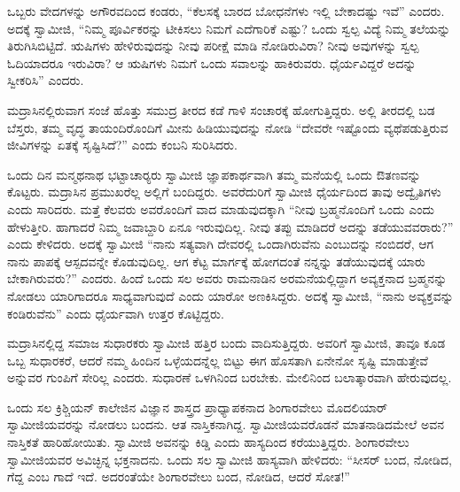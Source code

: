  ಒಬ್ಬರು ವೇದಗಳನ್ನು ಅಗೌರವದಿಂದ ಕಂಡರು, “ಕೆಲಸಕ್ಕೆ ಬಾರದ ಬೋಧನೆಗಳು ಇಲ್ಲಿ ಬೇಕಾದಷ್ಟು ಇವೆ” ಎಂದರು. ಅದಕ್ಕೆ ಸ್ವಾಮೀಜಿ, “ನಿಮ್ಮ ಪೂರ್ವಿಕರನ್ನು ಟೀಕಿಸಲು ನಿಮಗೆ ಎದೆಗಾರಿಕೆ ಎಷ್ಟು? ಒಂದು ಸ್ವಲ್ಪ ವಿದ್ಯೆ ನಿಮ್ಮ ತಲೆಯನ್ನು ತಿರುಗಿಸಿಬಿಟ್ಟಿದೆ. ಋಷಿಗಳು ಹೇಳಿರುವುದನ್ನು ನೀವು ಪರೀಕ್ಷೆ ಮಾಡಿ ನೋಡಿರುವಿರಾ? ನೀವು ಅವುಗಳನ್ನು ಸ್ವಲ್ಪ ಓದಿಯಾದರೂ ಇರುವಿರಾ? ಆ ಋಷಿಗಳು ನಿಮಗೆ ಒಂದು ಸವಾಲನ್ನು ಹಾಕಿರುವರು. ಧೈರ್ಯವಿದ್ದರೆ ಅದನ್ನು ಸ್ವೀಕರಿಸಿ” ಎಂದರು. 

 ಮದ್ರಾಸಿನಲ್ಲಿರುವಾಗ ಸಂಜೆ ಹೊತ್ತು ಸಮುದ್ರ ತೀರದ ಕಡೆ ಗಾಳಿ ಸಂಚಾರಕ್ಕೆ ಹೋಗುತ್ತಿದ್ದರು. ಅಲ್ಲಿ ತೀರದಲ್ಲಿ ಬಡ ಬೆಸ್ತರು, ತಮ್ಮ ವೃದ್ಧ ತಾಯಂದಿರೊಂದಿಗೆ ಮೀನು ಹಿಡಿಯುವುದನ್ನು ನೋಡಿ “ದೇವರೇ ಇಷ್ಟೊಂದು ವ್ಯಥೆಪಡುತ್ತಿರುವ ಜೀವಿಗಳನ್ನು ಏತಕ್ಕೆ ಸೃಷ್ಟಿಸಿದೆ?” ಎಂದು ಕಂಬನಿ ಸುರಿಸಿದರು. 

 ಒಂದು ದಿನ ಮನ್ಮಥನಾಥ ಭಟ್ಟಾಚಾರ‍್ಯರು ಸ್ವಾಮೀಜಿ ಜ್ಞಾಪಕಾರ್ಥವಾಗಿ ತಮ್ಮ ಮನೆಯಲ್ಲಿ ಒಂದು ಔತಣವನ್ನು ಕೊಟ್ಟರು. ಮದ್ರಾಸಿನ ಪ್ರಮುಖರೆಲ್ಲ ಅಲ್ಲಿಗೆ ಬಂದಿದ್ದರು. ಅವರೆದುರಿಗೆ ಸ್ವಾಮೀಜಿ ಧೈರ್ಯದಿಂದ ತಾವು ಅದ್ವೈತಿಗಳು ಎಂದು ಸಾರಿದರು. ಮತ್ತೆ ಕೆಲವರು ಅವರೊಂದಿಗೆ ವಾದ ಮಾಡುವುದಕ್ಕಾಗಿ “ನೀವು ಬ್ರಹ್ಮನೊಂದಿಗೆ ಒಂದು ಎಂದು ಹೇಳುತ್ತೀರಿ. ಹಾಗಾದರೆ ನಿಮ್ಮ ಜವಾಬ್ದಾರಿ ಏನೂ ಇರುವುದಿಲ್ಲ. ನೀವು ತಪ್ಪು ಮಾಡಿದರೆ ಅದನ್ನು ತಡೆಯುವವರಾರು?” ಎಂದು ಕೇಳಿದರು. ಅದಕ್ಕೆ ಸ್ವಾಮೀಜಿ “ನಾನು ಸತ್ಯವಾಗಿ ದೇವರಲ್ಲಿ ಒಂದಾಗಿರುವೆನು ಎಂಬುದನ್ನು ನಂಬಿದರೆ, ಆಗ ನಾನು ಪಾಪಕ್ಕೆ ಆಸ್ಪದವನ್ನೇ ಕೊಡುವುದಿಲ್ಲ. ಆಗ ಕೆಟ್ಟ ಮಾರ್ಗಕ್ಕೆ ಹೋಗದಂತೆ ನನ್ನನ್ನು ತಡೆಯುವುದಕ್ಕೆ ಯಾರು ಬೇಕಾಗಿರುವರು?” ಎಂದರು. ಹಿಂದೆ ಒಂದು ಸಲ ಅವರು ರಾಮನಾಡಿನ ಅರಮನೆಯಲ್ಲಿದ್ದಾಗ ಅವ್ಯಕ್ತನಾದ ಬ್ರಹ್ಮನನ್ನು ನೋಡಲು ಯಾರಿಗಾದರೂ ಸಾಧ್ಯವಾಗುವುದೆ ಎಂದು ಯಾರೋ ಅಣಕಿಸಿದ್ದರು. ಅದಕ್ಕೆ ಸ್ವಾಮೀಜಿ, “ನಾನು ಅವ್ಯಕ್ತವನ್ನು ಕಂಡಿರುವೆನು” ಎಂದು ಧೈರ್ಯವಾಗಿ ಉತ್ತರ ಕೊಟ್ಟಿದ್ದರು. 

 ಮದ್ರಾಸಿನಲ್ಲಿದ್ದ ಸಮಾಜ ಸುಧಾರಕರು ಸ್ವಾಮೀಜಿ ಹತ್ತಿರ ಬಂದು ವಾದಿಸುತ್ತಿದ್ದರು. ಅವರಿಗೆ ಸ್ವಾಮೀಜಿ, ತಾವೂ ಕೂಡ ಒಬ್ಬ ಸುಧಾರಕರೆ, ಆದರೆ ನಮ್ಮ ಹಿಂದಿನ ಒಳ್ಳೆಯದನ್ನೆಲ್ಲ ಬಿಟ್ಟು ಈಗ ಹೊಸತಾಗಿ ಏನೇನೋ ಸೃಷ್ಟಿ ಮಾಡುತ್ತೇವೆ ಅನ್ನುವರ ಗುಂಪಿಗೆ ಸೇರಿಲ್ಲ ಎಂದರು. ಸುಧಾರಣೆ ಒಳಗಿನಿಂದ ಬರಬೇಕು. ಮೇಲಿನಿಂದ ಬಲಾತ್ಕಾರವಾಗಿ ಹೇರುವುದಲ್ಲ. 

\newpage

 ಒಂದು ಸಲ ಕ್ರಿಶ್ಚಿಯನ್ ಕಾಲೇಜಿನ ವಿಜ್ಞಾನ ಶಾಸ್ತ್ರದ ಪ್ರಾಧ್ಯಾಪಕನಾದ ಶಿಂಗಾರವೇಲು ಮೊದಲಿಯಾರ್ ಸ್ವಾಮೀಜಿಯವರನ್ನು ನೋಡಲು ಬಂದನು. ಆತ ನಾಸ್ತಿಕನಾಗಿದ್ದ. ಸ್ವಾಮೀಜಿಯವರೊಡನೆ ಮಾತನಾಡಿದಮೇಲೆ ಅವನ ನಾಸ್ತಿಕತೆ ಹಾರಿಹೋಯಿತು. ಸ್ವಾಮೀಜಿ ಅವನನ್ನು ಕಿಡ್ಡಿ ಎಂದು ಹಾಸ್ಯದಿಂದ ಕರೆಯುತ್ತಿದ್ದರು. ಶಿಂಗಾರವೇಲು ಸ್ವಾಮೀಜಿಯವರ ಅವಿಚ್ಛಿನ್ನ ಭಕ್ತನಾದನು. ಒಂದು ಸಲ ಸ್ವಾಮೀಜಿ ಹಾಸ್ಯವಾಗಿ ಹೇಳಿದರು: “ಸೀಸರ್ ಬಂದ, ನೋಡಿದ, ಗೆದ್ದ ಎಂಬ ಗಾದೆ ಇದೆ. ಅದರಂತೆಯೇ ಶಿಂಗಾರವೇಲು ಬಂದ, ನೋಡಿದ, ಆದರೆ ಸೋತ!” 

